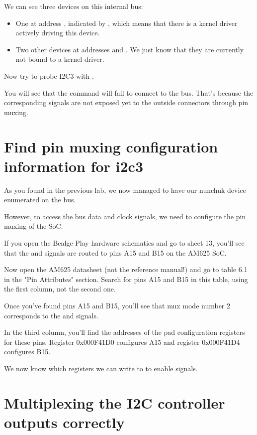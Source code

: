 We can see three devices on this internal bus:
\begin{itemize}
\item One at address , indicated by ,
      which means that there is a kernel driver actively
      driving this device.
\item Two other devices at addresses  and .
      We just know that they are currently not bound to a kernel driver.
\end{itemize}

Now try to probe I2C3 with .

You will see that the command will fail to connect to
the bus. That's because the corresponding signals are
not exposed yet to the outside connectors through pin muxing.

\section{Find pin muxing configuration information for i2c3}

As you found in the previous lab, we now managed to have our nunchuk
device enumerated on the  bus.

However, to access the bus data and clock signals, we need to configure
the pin muxing of the SoC.

If you open the Bealge Play hardware schematics and go to sheet 13,
you'll see that the  and  signals are routed to pins
A15 and B15 on the AM625 SoC.

Now open the AM625 datasheet (not the reference manual!) and go to
table 6.1 in the "Pin Attributes" section. Search for pins A15 and
B15 in this table, using the first column, not the second one.

Once you've found pins A15 and B15, you'll see that mux mode number 2
corresponds to the  and  signals.

In the third column, you'll find the addresses of the pad configuration
registers for these pins. Register 0x000F41D0 configures A15 and register
0x000F41D4 configures B15.


We now know which registers we can write to to enable 
signals.

\section{Multiplexing the I2C controller outputs correctly}

